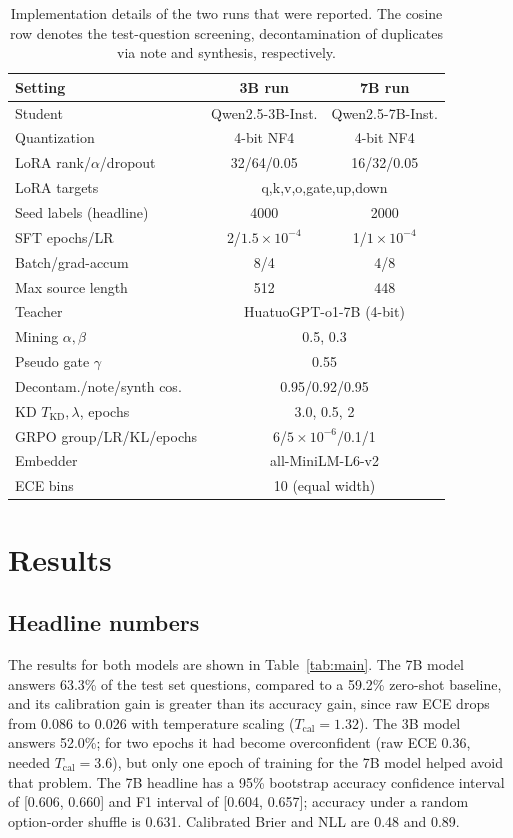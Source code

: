 \documentclass[conference]{IEEEtran}
\begin{document}
\begin{table}[tb]
\caption{Implementation details of the two runs that were reported. The cosine row denotes the test-question screening, decontamination of duplicates via note and synthesis, respectively.}\label{tab:impl}
\centering
\scriptsize
\setlength{\tabcolsep}{2pt}
\begin{tabular}{@{}lcc@{}}
\toprule
Setting & 3B run & 7B run \\
\midrule
Student & Qwen2.5-3B-Inst. & Qwen2.5-7B-Inst. \\
Quantization & 4-bit NF4 & 4-bit NF4 \\
LoRA rank/$\alpha$/dropout & 32/64/0.05 & 16/32/0.05 \\
LoRA targets & \multicolumn{2}{c}{q,k,v,o,gate,up,down} \\
Seed labels (headline) & 4000 & 2000 \\
SFT epochs/LR & 2/$1.5\!\times\!10^{-4}$ & 1/$1\!\times\!10^{-4}$ \\
Batch/grad-accum & 8/4 & 4/8 \\
Max source length & 512 & 448 \\
Teacher & \multicolumn{2}{c}{HuatuoGPT-o1-7B (4-bit)} \\
Mining $\alpha,\beta$ & \multicolumn{2}{c}{0.5, 0.3} \\
Pseudo gate $\gamma$ & \multicolumn{2}{c}{0.55} \\
Decontam./note/synth cos. & \multicolumn{2}{c}{0.95/0.92/0.95} \\
KD $T_{\text{KD}},\lambda$, epochs & \multicolumn{2}{c}{3.0, 0.5, 2} \\
GRPO group/LR/KL/epochs & \multicolumn{2}{c}{6/$5\!\times\!10^{-6}$/0.1/1} \\
Embedder & \multicolumn{2}{c}{all-MiniLM-L6-v2} \\
ECE bins & \multicolumn{2}{c}{10 (equal width)} \\
\bottomrule
\end{tabular}
\end{table}

\section{Results}\label{sec:results}

\subsection{Headline numbers}
The results for both models are shown in Table~\ref{tab:main}. The 7B model answers 63.3\% of the test set questions, compared to a 59.2\% zero-shot baseline, and its calibration gain is greater than its accuracy gain, since raw ECE drops from 0.086 to 0.026 with temperature scaling ($T_{\text{cal}}=1.32$). The 3B model answers 52.0\%; for two epochs it had become overconfident (raw ECE 0.36, needed $T_{\text{cal}}=3.6$), but only one epoch of training for the 7B model helped avoid that problem. The 7B headline has a 95\% bootstrap accuracy confidence interval of [0.606, 0.660] and F1 interval of [0.604, 0.657]; accuracy under a random option-order shuffle is 0.631. Calibrated Brier and NLL are 0.48 and 0.89.
\end{document}
